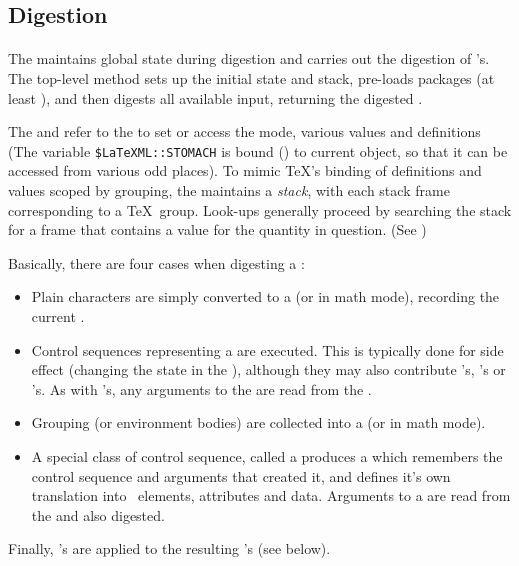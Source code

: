 \documentclass{article}
\begin{document}
\subsection{Digestion}
\paragraph{}
The  maintains global state during digestion and carries out the digestion of 's.
The top-level method  sets up the initial state and stack, 
pre-loads packages (at least ), and then digests all available input, 
returning the digested .

The  and  refer to the  to set or access the mode, various values and
definitions (The variable \verb|$LaTeXML::STOMACH| is bound () to current 
 object, so that it can be accessed from various odd places).
To mimic \TeX's binding of definitions and values scoped by grouping, 
the  maintains a \emph{stack}, with each stack frame corresponding to a \TeX\ group.
Look-ups generally proceed by searching the stack for a frame that contains a value for the quantity
in question.  (See )

Basically, there are four cases when digesting a :
 \begin{itemize}
  \item Plain characters are simply converted to a  (or  in math mode), 
   recording the current .
  \item Control sequences representing a  are executed.  This is typically
   done for side effect (changing the state in the ), although they may also
   contribute 's, 's or 's.
   As with 's, any arguments to the  are read from the .
  \item Grouping (or environment bodies) are collected into a 
   (or  in math mode).
  \item A special class of control sequence, called a  produces a 
    which remembers the control sequence and arguments that
   created it, and defines it's own translation into \XML\ elements, attributes and data.
   Arguments to a  are read from the  and also digested.
 \end{itemize}
Finally, 's are applied to the resulting 's (see below).
\end{document}
